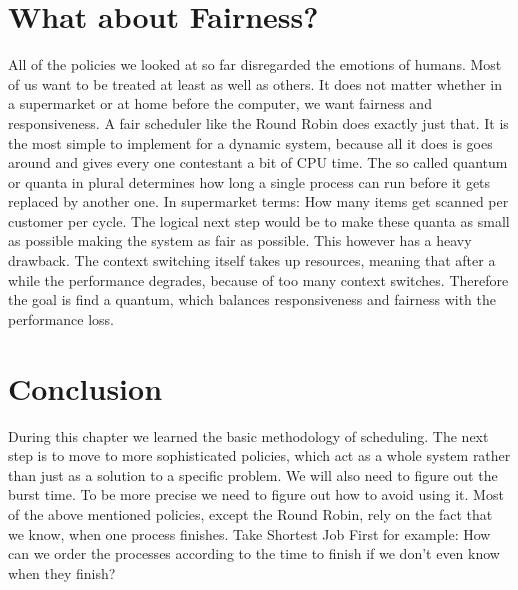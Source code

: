 \section{What about Fairness?} \label{sec:rr}

All of the policies we looked at so far disregarded the emotions of humans.
Most of us want to be treated at least as well as others.
It does not matter whether in a supermarket or at home before the computer, we want fairness and responsiveness.
A fair scheduler like the Round Robin does exactly just that. 
It is the most simple to implement for a dynamic system, because all it does is goes around and gives every one contestant a bit of CPU time.
The so called quantum or quanta in plural determines how long a single process can run before it gets replaced by another one.
In supermarket terms: How many items get scanned per customer per cycle.
The logical next step would be to make these quanta as small as possible making the system as fair as possible.
This however has a heavy drawback.
The context switching itself takes up resources, meaning that after a while the performance degrades, because of too many context switches.
Therefore the goal is find a quantum, which balances responsiveness and fairness with the performance loss.



 \section{Conclusion}

During this chapter we learned the basic methodology of scheduling.
The next step is to move to more sophisticated policies, which act as a whole system rather than just as a solution to a specific problem.
We will also need to figure out the burst time.
To be more precise we need to figure out how to avoid using it.
Most of the above mentioned policies, except the Round Robin, rely on the fact that we know, when one process finishes.
Take Shortest Job First for example: How can we order the processes according to the time to finish if we don't even know when they finish?